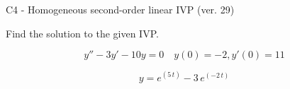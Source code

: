 \begin{exercise}
  \begin{exerciseTitle}C4 - Homogeneous second-order linear IVP (ver. 29)\end{exerciseTitle}
  \begin{exerciseStatement}
    
Find the solution to the given IVP.

    
\[y''-3y'-10y = 0 \hspace{1em} y(0) = -2 , y'(0) = 11\]

  \end{exerciseStatement}
  \begin{exerciseAnswer}
    
\[y= e^{\left(5 \, t\right)} - 3 \, e^{\left(-2 \, t\right)}\]

  \end{exerciseAnswer}
\end{exercise}